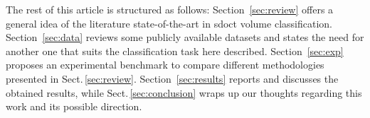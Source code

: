 The rest of this article is structured as follows: Section~\ref{sec:review} offers a general idea of the literature state-of-the-art in \gls{sdoct} volume classification. Section~\ref{sec:data} reviews some publicly available datasets and states the need for another one that suits the classification task here described.
Section~\ref{sec:exp} proposes an experimental benchmark to compare different methodologies presented in Sect.\,\ref{sec:review}.
Section~\ref{sec:results} reports and discusses the obtained results, while Sect.\,\ref{sec:conclusion} wraps up our thoughts regarding this work and its possible direction.


